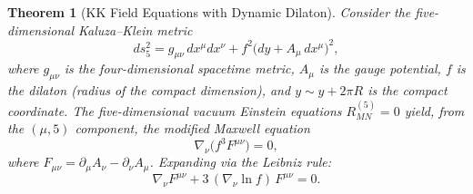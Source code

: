 \documentclass[letterpaper,twocolumn,superscriptaddress,longbibliography]{revtex4-2}
\newtheorem{theorem}{Theorem}[section]
\begin{document}
\begin{theorem}[KK Field Equations with Dynamic Dilaton]
\label{thm:KK}
Consider the five-dimensional Kaluza--Klein metric
\begin{equation}
  ds_5^2 = g_{\mu\nu}\,dx^\mu dx^\nu
  + f^2\bigl(dy + A_\mu\,dx^\mu\bigr)^2,
  \label{eq:KK_metric}
\end{equation}
where $g_{\mu\nu}$ is the four-dimensional spacetime metric,
$A_\mu$ is the gauge potential, $f$ is the dilaton (radius
of the compact dimension), and $y \sim y + 2\pi R$ is the
compact coordinate.
The five-dimensional vacuum Einstein equations
$R_{MN}^{(5)} = 0$ yield, from the $(\mu,5)$ component,
the modified Maxwell equation
\begin{equation}
  \nabla_\nu\!\bigl(f^3 F^{\mu\nu}\bigr) = 0,
  \label{eq:KK_maxwell_compact}
\end{equation}
where $F_{\mu\nu} = \partial_\mu A_\nu - \partial_\nu A_\mu$.
Expanding via the Leibniz rule:
\begin{equation}
  \boxed{\;
  \nabla_\nu F^{\mu\nu}
  + 3\,(\nabla_\nu \ln f)\,F^{\mu\nu} = 0.
  \;}
  \label{eq:KK_maxwell}
\end{equation}
\end{theorem}
\end{document}
